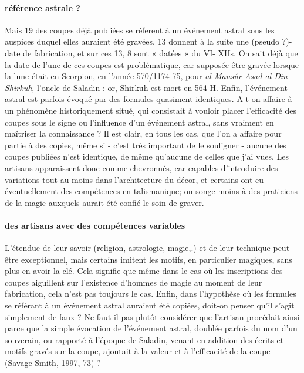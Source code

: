 \paragraph{référence astrale ?}
Mais 19 des coupes déjà publiées se réferent à un événement astral sous les auspices duquel elles auraient été gravées, 13 donnent à la suite une (pseudo ?)-date de fabrication, et sur ces 13, 8 sont « datées » du VI- XIIs.
On sait déjà que la date de l'une de ces coupes est problématique, car supposée être gravée lorsque la lune était en Scorpion, en l'année
570/1174-75, pour \textit{al-Mansûr Asad al-Din Shirkuh}, l'oncle de Saladin : or, Shirkuh est mort en 564 H. Enfin, l'événement astral est parfois évoqué par des formules quasiment identiques. A-t-on affaire à un phénomène historiquement situé, qui consistait à vouloir placer l'efficacité des coupes sous le signe ou l'influence d'un événement astral, sans vraiment en maîtriser la connaissance ? Il est clair, en tous les cas, que l'on a affaire pour partie à des copies, même si - c'est très important de le souligner
- aucune des coupes publiées n'est identique, de même qu'aucune de celles que j'ai vues. Les artisans apparaissent donc comme chevronnés, car capables d'introduire des variations tout au moins dans l'architecture du décor, et certains ont eu éventuellement des compétences en talismanique; on songe moins à des praticiens de la magie auxquels aurait été confié le soin de graver. 
\paragraph{des artisans avec des compétences variables}
L'étendue de leur savoir (religion, astrologie, magie,.) et de leur technique peut être exceptionnel, mais certains imitent les motifs, en particulier magiques, sans plus en avoir la clé. Cela signifie que même dans le cas où les inscriptions des coupes aiguillent sur l'existence d'hommes de magie au moment de leur fabrication, cela n'est pas toujours le cas. Enfin, dans l'hypothèse où les formules se référant à un événement astral auraient été copiées, doit-on penser qu'il s'agit simplement de faux ? Ne faut-il pas plutôt considérer que l'artisan procédait ainsi parce que la simple évocation de l'événement astral, doublée parfois du nom d'un souverain, ou rapporté à l'époque de Saladin, venant en addition des écrits et motifs gravés sur la coupe, ajoutait à la valeur et à l'efficacité de la coupe (Savage-Smith, 1997, 73) ? 
